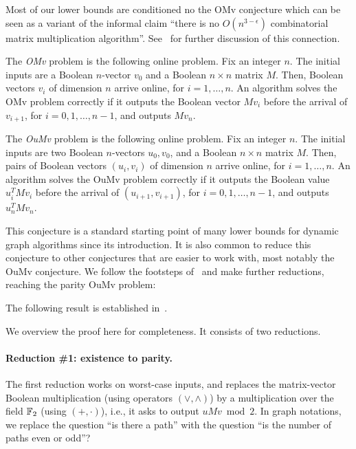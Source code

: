\documentclass[letter,11pt]{article}
\newcommand{\omv}{\textnormal{\textsf{OMv}}\xspace}
\newcommand{\oumv}{\textnormal{\textsf{OuMv}}\xspace}
\begin{document}
Most of our lower bounds are conditioned no the \omv conjecture which can be seen as a variant of the informal claim ``there is no $O(n^{3-\epsilon})$ combinatorial matrix multiplication algorithm''.  See~\cite{HenzingerKNS15} for further discussion of this connection.

\begin{definition}[the \omv problem]
    The \emph{\omv} problem is the following online problem. Fix an integer $n$. 
    The initial inputs are a Boolean $n$-vector $v_0$ and a Boolean $n\times n$ matrix $M$.
	Then, Boolean vectors $v_i$ of dimension $n$ arrive online, for $i=1,\dots, n$.
	An algorithm solves the \omv problem correctly if it outputs the Boolean vector $Mv_i$ before the arrival of $v_{i+1}$, for $i = 0,1,\dots, n-1$, and outputs $M v_n$.
\end{definition}


\begin{definition}[the \oumv problem]
    The \emph{\oumv} problem is the following online problem. Fix an integer $n$. 
    The initial inputs are two Boolean $n$-vectors $u_0, v_0$, and a Boolean $n\times n$ matrix $M$.
	Then, pairs of Boolean vectors $(u_i, v_i)$ of dimension $n$ arrive online, for $i=1,\dots, n$.
	An algorithm solves the \oumv problem correctly if it outputs the Boolean value $u_i^T M v_i$ before the arrival of $(u_{i+1},v_{i+1})$, for $i = 0,1,\dots, n-1$, and outputs $u_n^T M v_n$.
\end{definition}



\omvconj*

This conjecture is a standard starting point of many lower bounds for dynamic graph algorithms since its introduction.
It is also common to reduce this conjecture to other conjectures that are easier to work with, most notably the \oumv conjecture.
We follow the footsteps of~\cite{HLS22} and make further reductions, reaching the parity \oumv problem:
\DefParityOUMV*

The following result is established in~\cite{HLS22}.

\lemavgparoumv*

We overview the proof here for completeness. It consists of two reductions.

\paragraph{Reduction \#1: existence to parity.}
The first reduction works on worst-case inputs, and replaces the matrix-vector Boolean multiplication (using operators $(\vee, \wedge)$) by a multiplication over the field $\mathbb{F}_2$ (using $(+, \cdot)$),
i.e., it asks to output $uMv \bmod 2$.
In graph notations, we replace the question ``is there a path'' with the question ``is the number of paths even or odd''?
\end{document}
